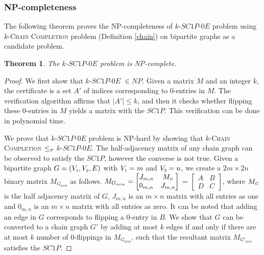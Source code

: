 \documentclass[review, 1p]{elsarticle}
\newtheorem{theorem}{Theorem}
\begin{document}
\subsubsection{\textup{\textbf{NP-completeness}}}\label{hard2}
The following theorem proves the NP-completeness of $k$-$SC1P$-$0E$ problem using \textsc{$k$-Chain Completion} problem (Definition \ref{chain}) on bipartite graphs as a candidate problem. 
 \begin{theorem} \label{thm4}
 The $k$-$SC1P$-$0E$ problem is NP-complete.
 \end{theorem}
 \begin{proof}
 We first show that $k$-$SC1P$-$0E$ $\in NP$. Given a matrix $M$ and an integer $k$, the certificate is a set $A'$ of indices corresponding to $0$-entries in $M$. The verification algorithm affirms that $\vert A' \vert \leq k$, and then it checks whether flipping these $0$-entries in $M$ yields a matrix with the $SC1P$. This verification can be done in polynomial time. 
 
 We prove that $k$-$SC1P$-$0E$ problem is NP-hard by showing that \textsc{$k$-Chain Completion} $\leq_{\mathsmaller {P}}$ $k$-$SC1P$-$0E$. The half-adjacency matrix of any chain graph can be observed to satisfy the $SC1P$, however the converse is not true. Given a bipartite graph $G=(V_{\mathsmaller{1}}, V_{\mathsmaller{2}}, E)$ with $V_{\mathsmaller{1}}=m$ and $V_{\mathsmaller{2}}=n$, we create a $2m \times 2n$ binary matrix $M_{G_{new}}$ as follows. $M_{G_{new}}= \begin{bmatrix}J_{m,n} &M_\mathsmaller{G}\\0_{m,n} &J_{m,n}\end{bmatrix} $ = $\begin{bmatrix}A &B \\D &C\end{bmatrix}$, where $M_{\mathsmaller{G}}$ is the half adjacency matrix of $G$, $J_{m,n}$ is an $m \times n$ matrix with all entries as one and $0_{m,n}$ is an $m \times n$ matrix with all entries as zero. It can be noted that adding an edge in $G$ corresponds to flipping a $0$-entry in $B$. We show that  $G$ can be converted to a chain graph $G'$ by adding at most $k$ edges if and only if there are at most $k$ number of $0$-flippings in $M_{G_{new}}$, such that the resultant matrix $M_{G'_{new}}$ satisfies the $SC1P$.


\end{proof}
\end{document}

